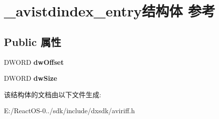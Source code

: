 \hypertarget{struct__avistdindex__entry}{}\section{\+\_\+avistdindex\+\_\+entry结构体 参考}
\label{struct__avistdindex__entry}
\subsection*{Public 属性}
\begin{DoxyCompactItemize}
\item 
\mbox{\label{struct__avistdindex__entry_ace2c38ef0a5ec3dbc86799b298f67caa}} 
D\+W\+O\+RD {\bfseries dw\+Offset}
\item 
\mbox{\label{struct__avistdindex__entry_a2d0f95cfe5c761fdf8380d2ed10c3b49}} 
D\+W\+O\+RD {\bfseries dw\+Size}
\end{DoxyCompactItemize}


该结构体的文档由以下文件生成\+:\begin{DoxyCompactItemize}
\item 
E\+:/\+React\+O\+S-\/0../sdk/include/dxsdk/aviriff.\+h\end{DoxyCompactItemize}
